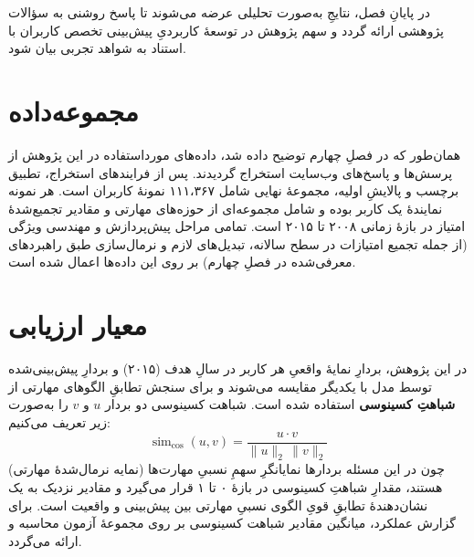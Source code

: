 در پایانِ فصل، نتایجِ به‌صورت تحلیلی عرضه می‌شوند تا پاسخ روشنی به سؤالات پژوهشی ارائه گردد و سهم پژوهش در توسعهٔ کاربردیِ پیش‌بینی تخصص‌ کاربران با استناد به شواهد تجربی بیان شود.

\section{مجموعه‌داده}
\label{sec:dataset}

همان‌طور که در فصلِ چهارم توضیح داده شد، داده‌های مورداستفاده در این پژوهش از پرسش‌ها و پاسخ‌های وب‌سایت  استخراج گردیدند. پس از فرایندهای استخراج، تطبیق برچسب و پالایشِ اولیه، مجموعهٔ نهایی شامل ۱۱۱،۳۶۷ نمونهٔ کاربران است. هر نمونه نمایندهٔ یک کاربر بوده و شامل مجموعه‌ای از حوزه‌های مهارتی و مقادیر تجمیع‌شدهٔ امتیاز در بازهٔ زمانی ۲۰۰۸ تا ۲۰۱۵ است. تمامی مراحل پیش‌پردازش و مهندسی ویژگی (از جمله تجمیع امتیازات در سطح سالانه، تبدیل‌های لازم و نرمال‌سازی طبق راهبرد‌های معرفی‌شده در فصلِ چهارم) بر روی این داده‌ها اعمال شده است.

\section{معیار ارزیابی}

در این پژوهش، بردارِ نمایهٔ واقعیِ هر کاربر در سالِ هدف (۲۰۱۵) و بردارِ پیش‌بینی‌شده توسط مدل با یکدیگر مقایسه می‌شوند و برای سنجش تطابقِ الگوهای مهارتی از \textbf{شباهتِ کسینوسی} استفاده شده است. شباهت کسینوسی دو بردار \(u\) و \(v\) را به‌صورت زیر تعریف می‌کنیم: 
\begin{equation}
   \operatorname{sim}_{\mathrm{cos}}(u,v) = \frac{u \cdot v}{\|u\|_2 \, \|v\|_2}
   \label{eq:cos_sim}
   \end{equation}
   چون در این مسئله بردارها نمایانگرِ سهمِ نسبیِ مهارت‌ها (نمایه نرمال‌شدهٔ مهارتی) هستند، مقدارِ شباهتِ کسینوسی در بازهٔ ۰ تا ۱ قرار می‌گیرد و مقادیر نزدیک به یک نشان‌دهندهٔ تطابقِ قویِ الگوی نسبیِ مهارتی بین پیش‌بینی و واقعیت است. برای گزارش عملکرد، میانگین مقادیر شباهت کسینوسی بر روی مجموعهٔ آزمون محاسبه و ارائه می‌گردد.

